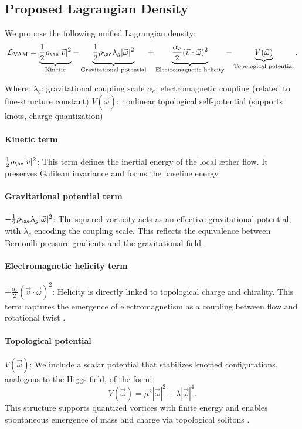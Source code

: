 \subsection{Proposed Lagrangian Density}
We propose the following unified Lagrangian density:
\begin{equation}
\mathcal{L}_{\text{VAM}} =
\underbrace{\frac{1}{2} \rho_{\ae} |\vec{v}|^2}_{\text{Kinetic}}
- \underbrace{\frac{1}{2} \rho_{\ae} \lambda_g |\vec{\omega}|^2}_{\text{Gravitational potential}}
+ \underbrace{\frac{\alpha_e}{2} (\vec{v} \cdot \vec{\omega})^2}_{\text{Electromagnetic helicity}}
- \underbrace{V(\vec{\omega})}_{\text{Topological potential}}.
\end{equation}

Where:
$\lambda_g$: gravitational coupling scale
$\alpha_e$: electromagnetic coupling (related to fine-structure constant)
$V(\vec{\omega})$: nonlinear topological self-potential (supports knots, charge quantization)

\paragraph{Kinetic term} $\frac{1}{2} \rho_{\ae} |\vec{v}|^2$: This term defines the inertial energy of the local \ae{}ther flow. It preserves Galilean invariance and forms the baseline energy.

\paragraph{Gravitational potential term} $-\frac{1}{2} \rho_{\ae} \lambda_g |\vec{\omega}|^2$: The squared vorticity acts as an effective gravitational potential, with $\lambda_g$ encoding the coupling scale. This reflects the equivalence between Bernoulli pressure gradients and the gravitational field \cite{helmholtz1858integrals, batchelor2000introduction}.

\paragraph{Electromagnetic helicity term} $+\frac{\alpha_e}{2} (\vec{v} \cdot \vec{\omega})^2$: Helicity is directly linked to topological charge and chirality. This term captures the emergence of electromagnetism as a coupling between flow and rotational twist \cite{moffatt1969degree, kato1990topological}.

\paragraph{Topological potential} $V(\vec{\omega})$: We include a scalar potential that stabilizes knotted configurations, analogous to the Higgs field, of the form:
\begin{equation}
V(\vec{\omega}) = \mu^2 |\vec{\omega}|^2 + \lambda |\vec{\omega}|^4.
\end{equation}
This structure supports quantized vortices with finite energy and enables spontaneous emergence of mass and charge via topological solitons \cite{ranada1990topological, arrayas2017knots}.

